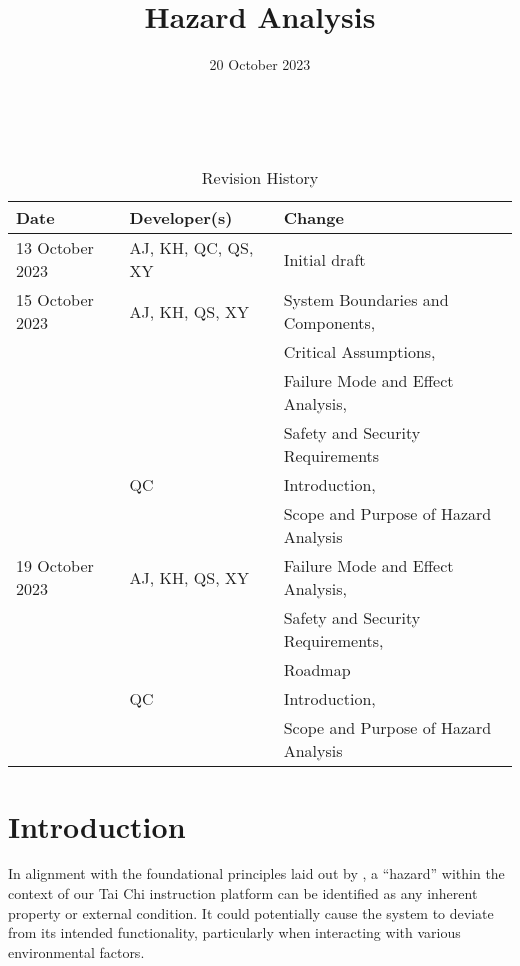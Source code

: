 \documentclass{article}
\title{Hazard Analysis\\\progname}
\author{\authname}
\date{20 October 2023}
\begin{document}
\maketitle
\thispagestyle{empty}

~\newpage


\begin{table}[hp]
  \caption{Revision History} \label{TblRevisionHistory}
  \begin{tabularx}{\textwidth}{llX}
    \toprule
    \textbf{Date} & \textbf{Developer(s)} & \textbf{Change}\\
    \midrule
    13 October 2023 & AJ, KH, QC, QS, XY & Initial draft \\
    \midrule
    15 October 2023 & AJ, KH, QS, XY & System Boundaries and Components,\\
    & & Critical Assumptions,\\
    & & Failure Mode and Effect Analysis,\\
    & & Safety and Security Requirements\\
    \midrule
    & QC & Introduction,\\
    & & Scope and Purpose of Hazard Analysis\\
    \midrule
    19 October 2023 & AJ, KH, QS, XY & Failure Mode and Effect Analysis,\\
    & & Safety and Security Requirements,\\
    & & Roadmap\\
    \midrule
    & QC & Introduction,\\
    & & Scope and Purpose of Hazard Analysis\\
    \bottomrule
  \end{tabularx}
\end{table}

\newpage{}

\tableofcontents{}
\listoftables{}

\newpage{}


\section{Introduction}

In alignment with the foundational principles laid out by
\textcite{leveson_engineering_2011}, a ``hazard'' within the context of our Tai
Chi instruction platform can be identified as any inherent property or external
condition. It could potentially cause the system to deviate from its intended
functionality, particularly when interacting with various environmental factors.
\end{document}
